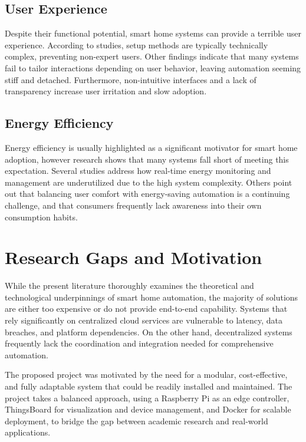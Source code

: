 \documentclass[a4paper,12pt]{report}
\begin{document}
\subsection{User Experience}
Despite their functional potential, smart home systems can provide a terrible user experience.  According to studies, setup methods are typically technically complex, preventing non-expert users\cite{sita2024development}\cite{bai2024research}.  Other findings indicate that many systems fail to tailor interactions depending on user behavior, leaving automation seeming stiff and detached\cite{elmi2023interoperable}.  Furthermore, non-intuitive interfaces and a lack of transparency increase user irritation and slow adoption\cite{mare2019consumer}.

\subsection{Energy Efficiency}
Energy efficiency is usually highlighted as a significant motivator for smart home adoption, however research shows that many systems fall short of meeting this expectation.  Several studies address how real-time energy monitoring and management are underutilized due to the high system complexity\cite{sita2024development}.  Others point out that balancing user comfort with energy-saving automation is a continuing challenge\cite{Sobin_2020}\cite{elmi2023interoperable}, and that consumers frequently lack awareness into their own consumption habits\cite{kaur2024evolution}.




\section{Research Gaps and Motivation}
While the present literature thoroughly examines the theoretical and technological underpinnings of smart home automation, the majority of solutions are either too expensive or do not provide end-to-end capability.  Systems that rely significantly on centralized cloud services are vulnerable to latency, data breaches, and platform dependencies.  On the other hand, decentralized systems frequently lack the coordination and integration needed for comprehensive automation.

 The proposed project was motivated by the need for a modular, cost-effective, and fully adaptable system that could be readily installed and maintained.  The project takes a balanced approach, using a Raspberry Pi as an edge controller, ThingsBoard for visualization and device management, and Docker for scalable deployment, to bridge the gap between academic research and real-world applications.
\end{document}
